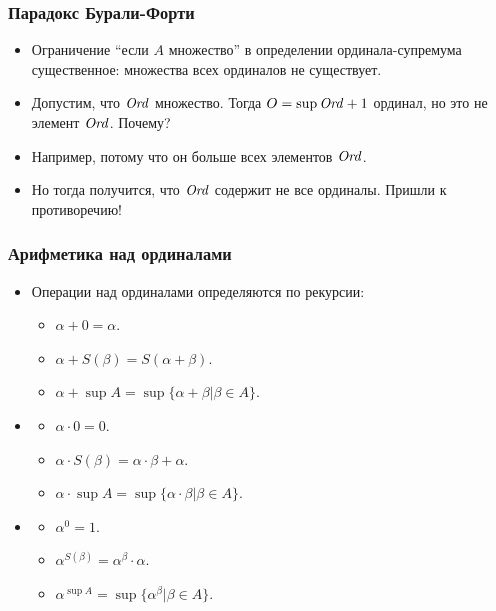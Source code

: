 \documentclass[10pt]{beamer}
\begin{document}
\begin{frame}
    \frametitle{Парадокс Бурали-Форти}
    \begin{itemize}
        \item Ограничение \enquote{если $A$ множество} в определении ординала-супремума существенное: множества всех ординалов не существует.
        \item Допустим, что $\mathit{Ord}$ множество. Тогда $O = \sup \mathit{Ord} + 1$ ординал, но это не элемент $\mathit{Ord}$. Почему? \pause
        \item Например, потому что он больше всех элементов $\mathit{Ord}$. \pause
        \item Но тогда получится, что $\mathit{Ord}$ содержит не все ординалы. Пришли к противоречию!
    \end{itemize}
\end{frame}

\begin{frame}
    \frametitle{Арифметика над ординалами}
    \begin{itemize}
        \item Операции над ординалами определяются по рекурсии:
        \begin{itemize}
            \item $\alpha + 0 = \alpha$.
            \item $\alpha + S(\beta) = S(\alpha + \beta)$.
            \item $\alpha + \sup A = \sup \{\alpha + \beta | \beta \in A\}$.
        \end{itemize}
        \item
        \begin{itemize}
            \item $\alpha \cdot 0 = 0$.
            \item $\alpha \cdot S(\beta) = \alpha \cdot \beta + \alpha$.
            \item $\alpha \cdot \sup A = \sup \{\alpha \cdot \beta | \beta \in A\}$.
        \end{itemize}
        \item
        \begin{itemize}
            \item $\alpha^0 = 1$.
            \item $\alpha^{S(\beta)} = \alpha^\beta \cdot \alpha$.
            \item $\alpha^{\sup A} = \sup \{\alpha^\beta | \beta \in A\}$.
        \end{itemize}
    \end{itemize}
\end{frame}
\end{document}
